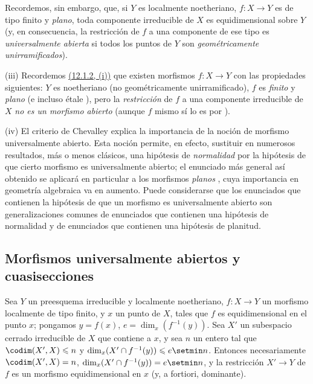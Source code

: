 \begin{remarks}[14.4.10]
Recordemos, sin embargo,  que, si $Y$ es localmente noetheriano, $f:X\to Y$ es de tipo finito y \emph{plano}, toda componente irreducible de $X$ es equidimensional sobre $Y$ (y, en consecuencia, la restricción de $f$ a una componente de ese tipo es \emph{universalmente abierta} si todos los puntos de $Y$ son \emph{geométricamente unirramificados}).

(iii) Recordemos {\hyperlink{ega4.c04.item.12-1-2}{(12.1.2, (i))}} que existen morfismos $f:X\to Y$ con las propiedades siguientes: $Y$ es noetheriano (no geométricamente unirramificado), $f$ es \emph{finito} y \emph{plano} (e incluso \'etale ), pero la \emph{restricción} de $f$ a una componente irreducible de $X$ \emph{no es un morfismo abierto} (aunque $f$ mismo sí lo es por ).

(iv) El criterio de Chevalley  explica la importancia de la noción de morfismo universalmente abierto.
Esta noción permite, en efecto, sustituir en numerosos resultados, más o menos clásicos, una hipótesis de \emph{normalidad} por la hipótesis de que cierto morfismo es universalmente abierto; el enunciado más general
así obtenido se aplicará en particular a los morfismos \emph{planos} , cuya importancia en geometría algebraica va en aumento.
Puede considerarse que los enunciados que contienen la hipótesis de que un morfismo es universalmente abierto son generalizaciones comunes de enunciados que contienen una hipótesis de normalidad y de enunciados que contienen una hipótesis de planitud.
\end{remarks}


\subsection{Morfismos universalmente abiertos y cuasisecciones}
\label{subsection:IV.14.5}
\label{IV.14.5}

\begin{lemma}[14.5.1]
\label{IV.14.5.1}
Sea $Y$ un preesquema irreducible y localmente noetheriano, $f:X\to Y$ un morfismo localmente de tipo finito, y $x$ un punto de $X$, tales que $f$ es equidimensional  en el punto $x$; pongamos $y=f(x)$, $e=\dim_x(f^{-1}(y))$.
Sea $X'$ un subespacio cerrado irreducible de $X$ que contiene a $x$, y sea $n$ un entero tal que $\codim(X',X)\leq n$ y $\dim_x(X'\cap f^{-1}(y))\leq e\setmin n$.
Entonces necesariamente $\codim(X',X)=n$, $\dim_x(X'\cap f^{-1}(y))=e\setmin n$, y la restricción $X'\to Y$ de $f$ es un morfismo equidimensional en $x$ (y, \textup{a fortiori}, dominante).
\end{lemma}

